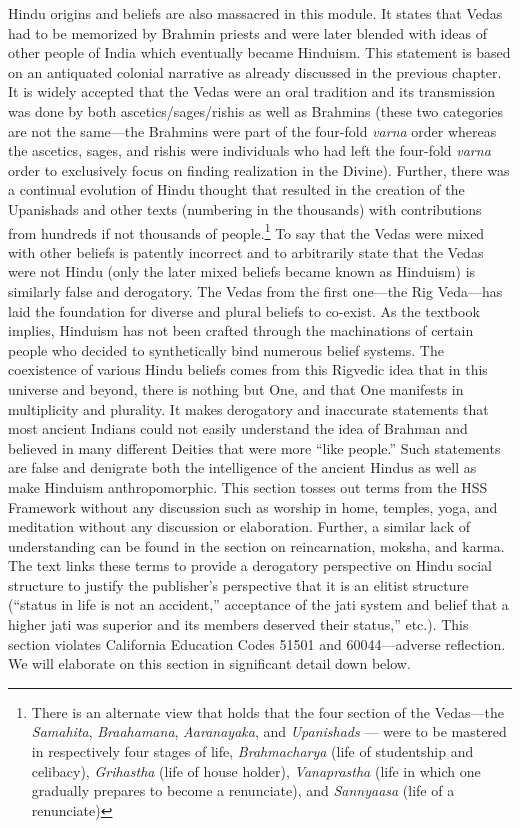 Hindu origins and beliefs are also massacred in this module. It states that Vedas had to be memorized by Brahmin priests and were later blended with ideas of other people of India which eventually became Hinduism. This statement is based on an antiquated colonial narrative as already discussed in the previous chapter. It is widely accepted that the Vedas were an oral tradition and its transmission was done by both ascetics/sages/rishis as well as Brahmins (these two categories are not the same—the Brahmins were part of the four-fold \textit{varna}  order whereas the ascetics, sages, and rishis were individuals who had left the four-fold \textit{varna}  order to exclusively focus on finding realization in the Divine). Further, there was a continual evolution of Hindu thought that resulted in the creation of the Upanishads and other texts (numbering in the thousands) with contributions from hundreds if not thousands of people.\footnote{There is an alternate view that holds that the four section of the 	Vedas—the \textit{Samahita}, \textit{Braahamana}, \textit{Aaranayaka}, and \textit{Upanishads} — were to be mastered in respectively four stages of life, \textit{Brahmacharya} (life of studentship and celibacy), \textit{Grihastha} (life of house holder), \textit{Vanaprastha} (life in which one gradually prepares to become a renunciate), and \textit{Sannyaasa} (life of a renunciate)} To say that the Vedas were mixed with other beliefs is patently incorrect and to arbitrarily state that the Vedas were not Hindu (only the later mixed beliefs became known as Hinduism) is similarly false and derogatory. The Vedas from the first one—the Rig Veda—has laid the foundation for diverse and plural beliefs to co-exist. As the textbook implies, Hinduism has not been crafted through the machinations of certain people who decided to synthetically bind numerous belief systems. The coexistence of various Hindu beliefs comes from this Rigvedic idea that in this universe and beyond, there is nothing but One, and that One manifests in multiplicity and plurality. It makes derogatory and inaccurate statements that most ancient Indians could not easily understand the idea of Brahman and believed in many different Deities that were more “like people.” Such statements are false and denigrate both the intelligence of the ancient Hindus as well as make Hinduism anthropomorphic. This section tosses out terms from the HSS Framework without any discussion such as worship in home, temples, yoga, and meditation without any discussion or elaboration. Further, a similar lack of understanding can be found in the section on reincarnation, moksha, and karma. The text links these terms to provide a derogatory perspective on Hindu social structure to justify the publisher’s perspective that it is an elitist structure (“status in life is not an accident,” acceptance of the jati system and belief that a higher jati was superior and its members deserved their status,” etc.). This section violates California Education Codes 51501 and 60044—adverse reflection. We will elaborate on this section in significant detail down below.  

